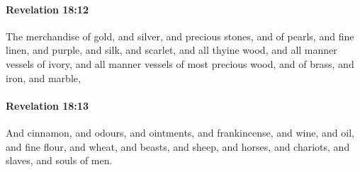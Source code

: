 		\paragraph{Revelation 18:12} %
			\label{REVELATIONNT-18-12}

			The merchandise of gold, and silver, and precious stones, and of pearls, and fine linen, and purple, and silk, and scarlet, and all thyine wood, and all manner vessels of ivory, and all manner vessels of most precious wood, and of brass, and iron, and marble,

			\begin{framed}
			\scriptsize
				\begin{compactdesc}
					\item[SBLG] 
				\end{compactdesc}
			\end{framed}

		\paragraph{Revelation 18:13} %
			\label{REVELATIONNT-18-13}

			And cinnamon, and odours, and ointments, and frankincense, and wine, and oil, and fine flour, and wheat, and beasts, and sheep, and horses, and chariots, and slaves, and souls of men.

